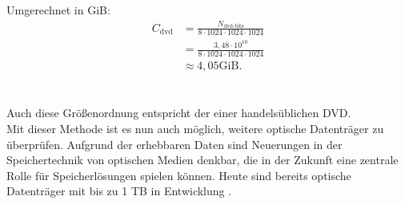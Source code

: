 \documentclass[9pt,twocolumn,twoside]{pnas-new}
\begin{document}
Umgerechnet in GiB:
\begin{align*}
C_{\mbox{dvd}} &= \frac{N_{\mbox{dvd-bits}}}{8\cdot1024\cdot1024\cdot1024}\\
&= \frac{3,48\cdot10^{10}}{8\cdot1024\cdot1024\cdot1024}\\
&\approx 4,05\mbox{GiB}.
\end{align*}
\\\\
Auch diese Größenordnung entspricht der einer handelsüblichen DVD.\\
Mit dieser Methode ist es nun auch möglich, weitere optische Datenträger zu überprüfen.
Aufgrund der erhebbaren Daten sind Neuerungen in der Speichertechnik von optischen Medien denkbar, die in der Zukunft eine zentrale Rolle für Speicherlösungen spielen können. Heute sind bereits optische Datenträger mit bis zu 1 TB in Entwicklung \cite{SonyPressStatement}.
\\

\end{document}
